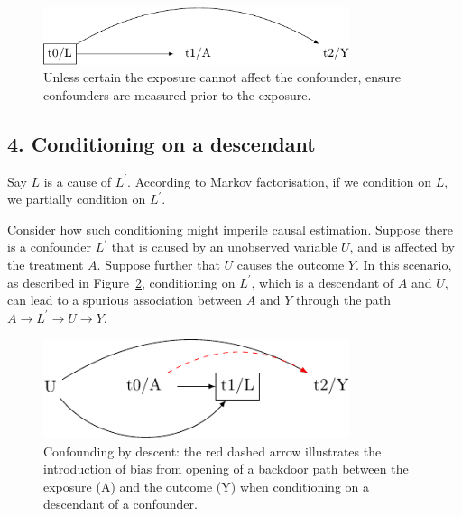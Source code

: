 \documentclass[
  singlecolumn]{report}
\begin{document}
\begin{figure}

{\centering \includegraphics[width=0.8\textwidth,height=\textheight]{causal-dags_files/figure-pdf/fig-dag-mediator-solution-1.pdf}

}

\caption{\label{fig-dag-mediator-solution}Unless certain the exposure
cannot affect the confounder, ensure confounders are measured prior to
the exposure.}

\end{figure}

\hypertarget{conditioning-on-a-descendant}{%
\subsection{4. Conditioning on a
descendant}\label{conditioning-on-a-descendant}}

Say \(L\) is a cause of \(L^\prime\). According to Markov factorisation,
if we condition on \(L\), we partially condition on \(L^\prime\).

Consider how such conditioning might imperile causal estimation. Suppose
there is a confounder \(L^\prime\) that is caused by an unobserved
variable \(U\), and is affected by the treatment \(A\). Suppose further
that \(U\) causes the outcome \(Y\). In this scenario, as described in
Figure~\ref{fig-dag-descendent}, conditioning on \(L^\prime\), which is
a descendant of \(A\) and \(U\), can lead to a spurious association
between \(A\) and \(Y\) through the path \(A \to L^\prime \to U \to Y\).

\begin{figure}

{\centering \includegraphics[width=0.8\textwidth,height=\textheight]{causal-dags_files/figure-pdf/fig-dag-descendent-1.pdf}

}

\caption{\label{fig-dag-descendent}Confounding by descent: the red
dashed arrow illustrates the introduction of bias from opening of a
backdoor path between the exposure (A) and the outcome (Y) when
conditioning on a descendant of a confounder.}

\end{figure}
\end{document}
